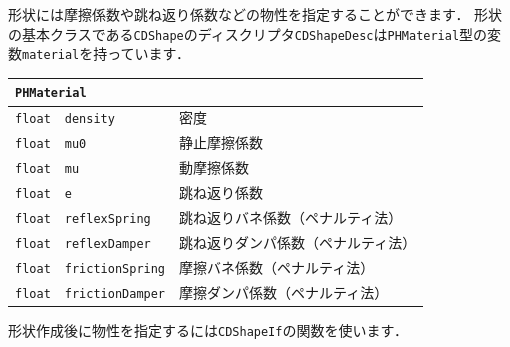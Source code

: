\KLUDGE 形状には摩擦係数や跳ね返り係数などの物性を指定することができます．
\KLUDGE 形状の基本クラスである\texttt{CDShape}のディスクリプタ\texttt{CDShapeDesc}は\texttt{PHMaterial}型の変数\texttt{material}を持っています．

\begin{center}
\begin{tabular}{lll}
\multicolumn{3}{l}{\texttt{PHMaterial}}							\\ \midrule
\texttt{float}	&	\texttt{density}		& 密度				\\
\texttt{float}	&	\texttt{mu0}			& 静止摩擦係数		\\
\texttt{float}	&	\texttt{mu}				& 動摩擦係数		\\
\texttt{float}	&	\texttt{e}				& 跳ね返り係数		\\
\texttt{float}	&	\texttt{reflexSpring}	& 跳ね返りバネ係数（ペナルティ法）	\\
\texttt{float}	&	\texttt{reflexDamper}	& 跳ね返りダンパ係数（ペナルティ法）\\
\texttt{float}	&	\texttt{frictionSpring}	& 摩擦バネ係数（ペナルティ法）	\\
\texttt{float}	&	\texttt{frictionDamper}	& 摩擦ダンパ係数（ペナルティ法）\\
\end{tabular}
\end{center}

\KLUDGE 形状作成後に物性を指定するには\texttt{CDShapeIf}の関数を使います．

